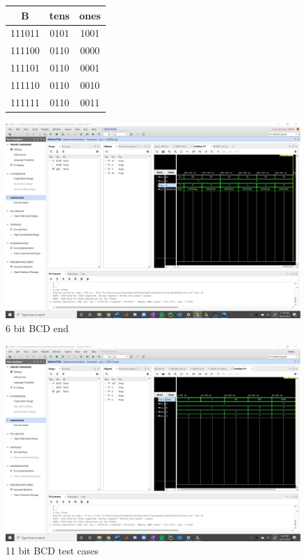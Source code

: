 \documentclass[11pt]{article}
\begin{document}
 

\begin{figure}[ht] \centering
	
	\begin{tabular}{c|cc}
		\toprule
		B & tens & ones \\
		\midrule
		111011 & 0101 & 1001 \\
		111100 & 0110 & 0000 \\
		111101 & 0110 & 0001 \\
		111110 & 0110 & 0010 \\
		111111 & 0110 & 0011 \\
		\bottomrule
	\end{tabular}
	
	\includegraphics[width=1\textwidth,trim=19cm 14cm 0cm 6cm,clip]{BCD6b_test_screen1}
	\caption{6 bit BCD end} 
	\label{fig:img3}
\end{figure}
 

\begin{figure}[ht] \centering
	\includegraphics[width=1\textwidth,trim=19cm 14cm 0cm 6cm,clip]{BCD11b_test_screen}
	\caption{11 bit BCD test cases}
	\label{fig:img4}
\end{figure}
\end{document}
